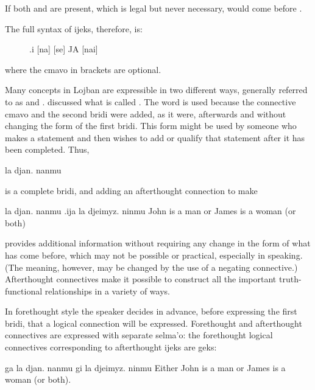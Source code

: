 If both  and  are present, which is legal but never
    necessary,  would come before . 

The full syntax of ijeks, therefore, is:
\begin{description}
\item[] .i [na] [se] JA [nai]
\end{description}

where the cmavo in brackets are optional.



Many concepts in Lojban are expressible in two different
    ways, generally referred to as  and
    .  discussed what is
    called . The word
     is used because the connective cmavo and the
    second bridi were added, as it were, afterwards and without
    changing the form of the first bridi. This form might be used
    by someone who makes a statement and then wishes to add or
    qualify that statement after it has been completed. Thus,
\begin{example}
la djan. nanmu
\end{example}

{\noindent}is a complete bridi, and adding an afterthought connection to
    make
\begin{example}
la djan. nanmu .ija la djeimyz. ninmu\n
John is a man or James is a woman (or both)
\end{example}

{\noindent}provides additional information without requiring any change in
    the form of what has come before, which may not be possible or
    practical, especially in speaking. (The meaning, however, may
    be changed by the use of a negating connective.) Afterthought
    connectives make it possible to construct all the important
    truth-functional relationships in a variety of ways. 

In forethought style the speaker decides in advance, before
    expressing the first bridi, that a logical connection will be
    expressed. Forethought and afterthought connectives are
    expressed with separate selma'o: the forethought logical
    connectives corresponding to afterthought ijeks are geks:
\begin{example}
ga la djan. nanmu gi la djeimyz. ninmu\n
Either John is a man or James is a woman (or both).
\end{example}

